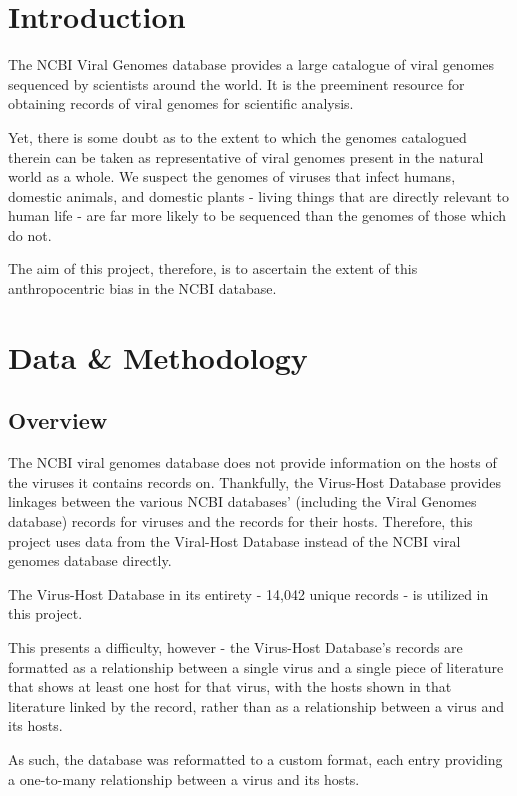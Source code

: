\documentclass[12pt]{article}
\begin{document}
    \section{Introduction}

    The NCBI Viral Genomes database provides a large catalogue of viral genomes 
    sequenced by scientists around the world. It is the preeminent resource for
    obtaining records of viral genomes for scientific analysis.

    Yet, there is some doubt as to the extent to which the genomes catalogued
    therein can be taken as representative of viral genomes present in the
    natural world as a whole. We suspect the genomes of viruses that infect
    humans, domestic animals, and domestic plants - living things that are
    directly relevant to human life - are far more likely to be sequenced than
    the genomes of those which do not.

    The aim of this project, therefore, is to ascertain the extent of this
    anthropocentric bias in the NCBI database.

    \section{Data \& Methodology}
    
    \subsection{Overview}

    The NCBI viral genomes database does not provide information on the hosts
    of the viruses it contains records on. Thankfully, the Virus-Host Database provides
    linkages between the various NCBI databases' (including the Viral Genomes
    database) records for viruses and the records for their hosts. Therefore,
    this project uses data from the Viral-Host Database instead of the NCBI viral
    genomes database directly.

    The Virus-Host Database in its entirety - 14,042 unique records - is utilized in
    this project.

    This presents a difficulty, however - the Virus-Host Database's records are
    formatted as a relationship between a single virus and a single piece of
    literature that shows at least one host for that virus, with the hosts shown
    in that literature linked by the record, rather than as a relationship between a
    virus and its hosts.

    As such, the database was reformatted to a custom format, each entry providing
    a one-to-many relationship between a virus and its hosts.
\end{document}
